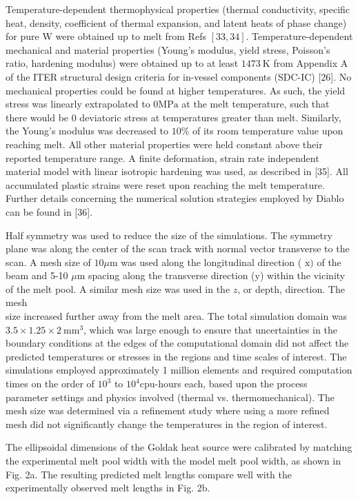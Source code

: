 \documentclass[10pt]{article}
\begin{document}
Temperature-dependent thermophysical properties (thermal conductivity, specific heat, density, coefficient of thermal expansion, and latent heats of phase change) for pure $\mathrm{W}$ were obtained up to melt from Refs $[33,34]$. Temperature-dependent mechanical and material properties (Young's modulus, yield stress, Poisson's ratio, hardening modulus) were obtained up to at least $1473 \mathrm{~K}$ from Appendix A of the ITER structural design criteria for in-vessel components (SDC-IC) [26]. No mechanical properties could be found at higher temperatures. As such, the yield stress was linearly extrapolated to $0 \mathrm{MPa}$ at the melt temperature, such that there would be 0 deviatoric stress at temperatures greater than melt. Similarly, the Young's modulus was decreased to $10 \%$ of its room temperature value upon reaching melt. All other material properties were held constant above their reported temperature range. A finite deformation, strain rate independent material model with linear isotropic hardening was used, as described in [35]. All accumulated plastic strains were reset upon reaching the melt temperature. Further details concerning the numerical solution strategies employed by Diablo can be found in [36].

Half symmetry was used to reduce the size of the simulations. The symmetry plane was along the center of the scan track with normal vector transverse to the scan. A mesh size of $10 \mu \mathrm{m}$ was used along the longitudinal direction ( $\mathrm{x})$ of the beam and 5-10 $\mu \mathrm{m}$ spacing along the transverse direction (y) within the vicinity of the melt pool. A similar mesh size was used in the $z$, or depth, direction. The mesh\\
size increased further away from the melt area. The total simulation domain was $3.5 \times 1.25 \times 2 \mathrm{~mm}^{3}$, which was large enough to ensure that uncertainties in the boundary conditions at the edges of the computational domain did not affect the predicted temperatures or stresses in the regions and time scales of interest. The simulations employed approximately 1 million elements and required computation times on the order of $10^{3}$ to $10^{4} \mathrm{cpu}$-hours each, based upon the process parameter settings and physics involved (thermal vs. thermomechanical). The mesh size was determined via a refinement study where using a more refined mesh did not significantly change the temperatures in the region of interest.

The ellipsoidal dimensions of the Goldak heat source were calibrated by matching the experimental melt pool width with the model melt pool width, as shown in Fig. 2a. The resulting predicted melt lengths compare well with the experimentally observed melt lengths in Fig. 2b.
\end{document}
